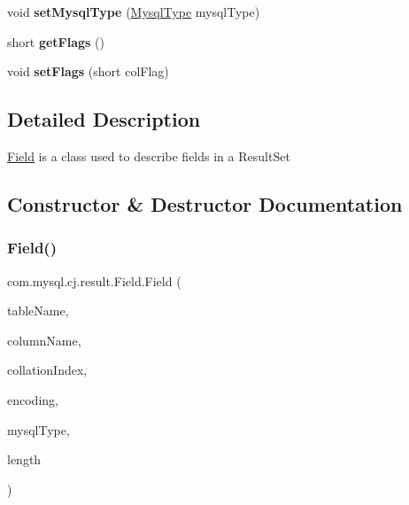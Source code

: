\begin{DoxyCompactItemize}
void {\bfseries set\+Mysql\+Type} (\mbox{\hyperlink{enumcom_1_1mysql_1_1cj_1_1_mysql_type}{Mysql\+Type}} mysql\+Type)
\item 
\mbox{\label{classcom_1_1mysql_1_1cj_1_1result_1_1_field_a30c42420744a39c420b7b0cade7f33b9}} 
short {\bfseries get\+Flags} ()
\item 
\mbox{\label{classcom_1_1mysql_1_1cj_1_1result_1_1_field_a5ff2e6ab274eb68345cc1422d571ff4a}} 
void {\bfseries set\+Flags} (short col\+Flag)
\end{DoxyCompactItemize}


\subsection{Detailed Description}
\mbox{\hyperlink{classcom_1_1mysql_1_1cj_1_1result_1_1_field}{Field}} is a class used to describe fields in a Result\+Set 

\subsection{Constructor \& Destructor Documentation}
\mbox{\label{classcom_1_1mysql_1_1cj_1_1result_1_1_field_a33e583bba81e01de1067f68e0a0c0e4a}} 
\subsubsection{\texorpdfstring{Field()}{Field()}}
{\footnotesize\ttfamily com.\+mysql.\+cj.\+result.\+Field.\+Field (\begin{DoxyParamCaption}\item[{String}]{table\+Name,  }\item[{String}]{column\+Name,  }\item[{int}]{collation\+Index,  }\item[{String}]{encoding,  }\item[{\mbox{\hyperlink{enumcom_1_1mysql_1_1cj_1_1_mysql_type}{Mysql\+Type}}}]{mysql\+Type,  }\item[{int}]{length }\end{DoxyParamCaption})}

